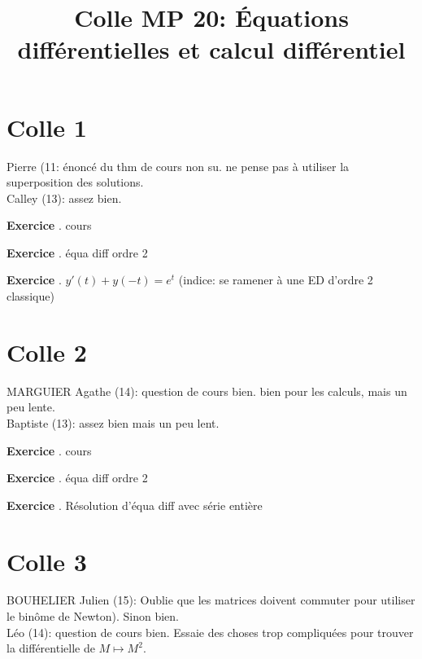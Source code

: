 \documentclass[10pt,a4paper]{article}
\title{Colle MP 20: Équations différentielles et calcul différentiel}
\newcounter{question}
\newcounter{exo}
\newenvironment{exo}{\vspace{0.5cm}\setcounter{question}{0}\addtocounter{exo}{1} \noindent \textbf{Exercice \theexo}. \normalsize }{\par}
\begin{document}
	\maketitle
	
	\section*{Colle 1}	
	Pierre (11: énoncé du thm de cours non su. ne pense pas à utiliser la superposition des solutions.\\
	Calley (13): assez bien.
	
	\begin{exo}
		cours
	\end{exo}

	\begin{exo}
		équa diff ordre 2
	\end{exo}

	\begin{exo}
		$y'(t) + y(-t) = e^t$ (indice: se ramener à une ED d'ordre 2 classique)
	\end{exo}			
	\section*{Colle 2}
	\setcounter{exo}{0}
	MARGUIER Agathe (14): question de cours bien. bien pour les calculs, mais un peu lente.\\
	Baptiste (13): assez bien mais un peu lent.\\
	
	\begin{exo}
		cours
	\end{exo}

	\begin{exo}
		équa diff ordre 2
	\end{exo}
	
	\begin{exo}
		Résolution d'équa diff avec série entière
	\end{exo}
			
	\section*{Colle 3}
	\setcounter{exo}{0}
	BOUHELIER Julien (15): Oublie que les matrices doivent commuter pour utiliser le binôme de Newton). Sinon bien.\\
	Léo (14): question de cours bien. Essaie des choses trop compliquées pour trouver la différentielle de $M \longmapsto M^2$.\\
	
\end{document}
